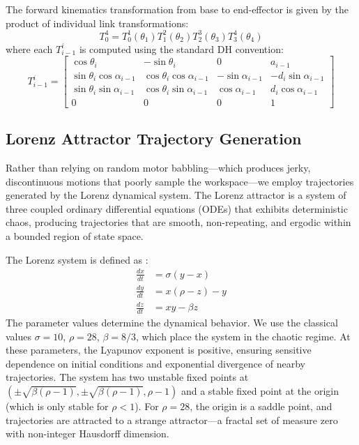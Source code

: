 \documentclass[12pt,a4paper,oneside]{report}
\begin{document}
The forward kinematics transformation from base to end-effector is given by the product of individual link transformations:
\begin{equation}
T_{0}^{4} = T_{0}^{1}(\theta_1) T_{1}^{2}(\theta_2) T_{2}^{3}(\theta_3) T_{3}^{4}(\theta_4)
\end{equation}
where each $T_{i-1}^{i}$ is computed using the standard DH convention:
\begin{equation}
T_{i-1}^{i} = 
\begin{bmatrix}
\cos\theta_i & -\sin\theta_i & 0 & a_{i-1} \\
\sin\theta_i \cos\alpha_{i-1} & \cos\theta_i \cos\alpha_{i-1} & -\sin\alpha_{i-1} & -d_i \sin\alpha_{i-1} \\
\sin\theta_i \sin\alpha_{i-1} & \cos\theta_i \sin\alpha_{i-1} & \cos\alpha_{i-1} & d_i \cos\alpha_{i-1} \\
0 & 0 & 0 & 1
\end{bmatrix}
\end{equation}

\subsection{Lorenz Attractor Trajectory Generation}

Rather than relying on random motor babbling---which produces jerky, discontinuous motions that poorly sample the workspace---we employ trajectories generated by the Lorenz dynamical system. The Lorenz attractor is a system of three coupled ordinary differential equations (ODEs) that exhibits deterministic chaos, producing trajectories that are smooth, non-repeating, and ergodic within a bounded region of state space.

The Lorenz system is defined as \cite{lorenz1963}:
\begin{align}
\frac{dx}{dt} &= \sigma(y - x) \\
\frac{dy}{dt} &= x(\rho - z) - y \\
\frac{dz}{dt} &= xy - \beta z
\end{align}
The parameter values determine the dynamical behavior. We use the classical values $\sigma = 10$, $\rho = 28$, $\beta = 8/3$, which place the system in the chaotic regime. At these parameters, the Lyapunov exponent is positive, ensuring sensitive dependence on initial conditions and exponential divergence of nearby trajectories. The system has two unstable fixed points at $(\pm\sqrt{\beta(\rho-1)}, \pm\sqrt{\beta(\rho-1)}, \rho-1)$ and a stable fixed point at the origin (which is only stable for $\rho < 1$). For $\rho = 28$, the origin is a saddle point, and trajectories are attracted to a strange attractor---a fractal set of measure zero with non-integer Hausdorff dimension.
\end{document}
